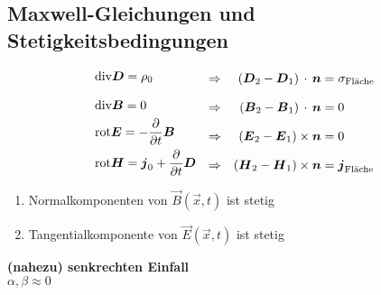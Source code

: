 
\subsection{Maxwell-Gleichungen und Stetigkeitsbedingungen} %

\begin{comment}
\begin{align*}
\tx{div} \vec{D} = \rho_0 \quad &\Rightarrow \quad \left(\vec{D}_2 - \vec{D}_1\right) \cdot \vec{n} = \sigma_{\tx{Fläche}}\\[5pt]
\tx{div} \vec{B} = 0 \quad &\Rightarrow \quad \left(\vec{B}_2 - \vec{B}_1\right) \cdot \vec{n} = 0\\
\tx{rot} \vec{E} = - \prt{}{t} \vec{B} \quad &\Rightarrow \quad \left(\vec{E}_2 - \vec{E}_1\right) \times \vec{n} = 0\\
\tx{rot} \vec{H} = \vec{j}_0 + \prt{}{t} \vec{D} \quad &\Rightarrow \quad \left(\vec{H}_2 - \vec{H}_1\right) \times \vec{n} = \vec{j}_{\tx{Fläche}}
\end{align*}
\end{comment}
\begin{equation*}
\begin{split}
&\textrm{div} \boldsymbol{D} = \rho_0 \\[8pt]
&\textrm{div} \boldsymbol{B} = 0 \\
&\textrm{rot} \boldsymbol{E} = - \frac{\partial }{\partial t} \boldsymbol{B} \\
&\textrm{rot} \boldsymbol{H} = \boldsymbol{j}_0 + \frac{\partial }{\partial t} \boldsymbol{D}
\end{split}
\begin{split}
\quad \Rightarrow \quad \\[8pt]
\quad \Rightarrow \quad \\[8pt]
\quad \Rightarrow \quad \\[8pt]
\quad \Rightarrow \quad 
\end{split}
\begin{split}
\left(\boldsymbol{D}_2 - \boldsymbol{D}_1\right) \, \cdot \, \boldsymbol{n} &= \sigma_{\textrm{Fläche}} \\[8pt]
\left(\boldsymbol{B}_2 - \boldsymbol{B}_1\right) \, \cdot \, \boldsymbol{n} &= 0 \\[8pt]
\left(\boldsymbol{E}_2 - \boldsymbol{E}_1\right) \times \boldsymbol{n} &= 0 \\[8pt]
\left(\boldsymbol{H}_2 - \boldsymbol{H}_1\right) \times \boldsymbol{n} &= \boldsymbol{j}_{\textrm{Fläche}}
\end{split}
\end{equation*}
\begin{enumerate}[$ \Rightarrow $]
	\item Normalkomponenten von $ \vec{B}(\vec{x},t) $ ist stetig
	\item Tangentialkomponente von $ \vec{E}(\vec{x},t) $ ist stetig
\end{enumerate}
\textbf{(nahezu) senkrechten Einfall}\\
$ \alpha,\beta \approx 0 $\\


